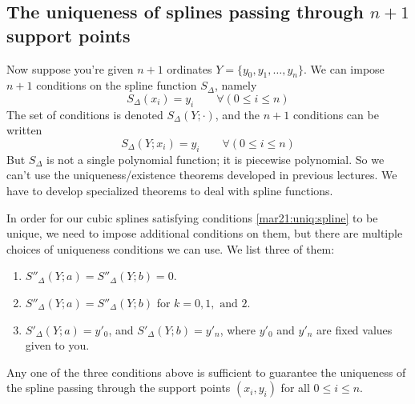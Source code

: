 \subsection{The uniqueness of splines passing through $n+1$ support points}

Now suppose you're given $n+1$ ordinates $Y = \{y_0, y_1, \dots ,y_n \}$. We can impose $n+1$ conditions on the spline function $S_\Delta$, namely
\[
  S_\Delta(x_i) = y_i \qquad \forall(0 \leq i \leq n)
\]
The set of conditions is denoted $S_\Delta(Y ; \cdot)$, and the $n+1$ conditions can be written
\begin{equation}
  \label{mar21:uniq:spline}
  S_\Delta(Y ; x_i) = y_i \qquad \forall(0 \leq i \leq n)
\end{equation}
But $S_\Delta$ is not a single polynomial function; it is piecewise polynomial. So we can't use the uniqueness/existence theorems developed in previous lectures. We have to develop specialized theorems to deal with spline functions.

In order for our cubic splines satisfying conditions \ref{mar21:uniq:spline} to be unique, we need to impose additional conditions on them, but there are multiple choices of uniqueness conditions we can use. We list three of them:

\begin{enumerate}[label = \arabic*)]
\item
  $S''_\Delta(Y ; a) = S''_\Delta(Y ; b) = 0$.
\item
  $S''_\Delta(Y ; a) = S''_\Delta(Y ; b)$ for $k = 0, 1, \text{ and } 2$.
\item
  $S'_\Delta(Y ; a) = y'_0$, and $S'_\Delta(Y ; b) = y'_n$, where $y'_0$ and $y'_n$ are fixed values given to you.
\end{enumerate}

Any one of the three conditions above is sufficient to guarantee the uniqueness of the spline passing through the support points $(x_i, y_i)$ for all $0 \leq i \leq n$.


